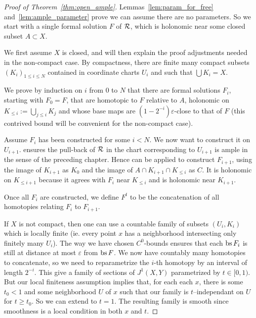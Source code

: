\begin{proof}[Proof of Theorem~\ref{thm:open_ample}]
  Lemmas~\ref{lem:param_for_free} and~\ref{lem:ample_parameter} prove we can
  assume there are no parameters. So we start with a single formal solution $F$
  of $\mathcal{R}$, which is holonomic near some closed subset $A ⊂ X$.

  We first assume $X$ is closed, and will then explain the proof
  adjustments needed in the non-compact case.
  By compactness, there are finite many compact subsets
  $(K_i)_{1 ≤ i ≤ N}$ contained in coordinate charts $U_i$ and such that
  $\bigcup K_i = X$.

  We prove by induction on $i$ from $0$ to $N$ that there are formal solutions
  $F_i$, starting with $F_0 = F$, that are homotopic to $F$ relative to $A$,
  holonomic on $K_{≤ i} := \bigcup_{j ≤ i} K_j$ and whose base maps are
  $(1-2^{-i})ε$-close to that of $F$ (this contrived bound will be convenient
  for the non-compact case).

  Assume $F_i$ has been constructed for some $i < N$.
  We now want to construct it on $U_{i+1}$.
   ensures the pull-back of $\mathcal{R}$ in the chart
  corresponding to $U_{i+1}$ is ample in the sense of the preceding
  chapter.
  Hence  can be applied to
  construct $F_{i+1}$, using the image of $K_{i+1}$ as $K_0$ and
  the image of $A ∩ K_{i+1} ∩ K_{≤ i}$ as $C$.
  It is holonomic on $K_{≤ i+1}$ because it agrees with $F_i$ near
  $K_{≤ i}$ and is holonomic near $K_{i+1}$.

  Once all $F_i$ are constructed, we define $F^t$ to be the concatenation of all
  homotopies relating $F_i$ to $F_{i+1}$.

  If $X$ is not compact, then one can use a countable family of subsets
  $(U_i, K_i)$ which is locally finite (ie. every point $x$ has a neighborhood
  intersecting only finitely many $U_i$). The way we have chosen $C^0$-bounds
  ensures that each $\operatorname{bs} F_i$ is still at distance at most $ε$ from $\operatorname{bs} F$. We
  now have countably many homotopies to concatenate, so we need to reparametrize
  the $i$-th homotopy by an interval of length $2^{-i}$. This give a family of
  sections of $J^1(X, Y)$ parametrized by $t ∈ [0, 1)$. But our local finiteness
  assumption implies that, for each each $x$, there is some $t_0 < 1$ and some
  neighborhood $U$ of $x$ such that our family is $t$--independant on $U$ for
  $t ≥ t_0$. So we can extend to $t = 1$.  The resulting family is smooth since
  smoothness is a local condition in both $x$ and $t$.
\end{proof}

